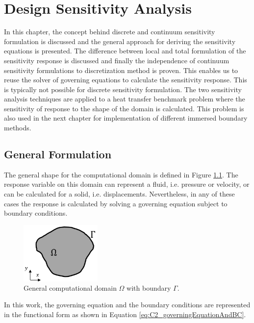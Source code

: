 \chapter{Design Sensitivity Analysis}\label{ch:sensitivityAnalysis}
In this chapter, the concept behind discrete and continuum sensitivity formulation is discussed and the general approach for deriving the sensitivity equations is presented. The difference between local and total formulation of the sensitivity response is discussed and finally the independence of continuum sensitivity formulations to discretization method is proven. This enables us to reuse the solver of governing equations to calculate the sensitivity response. This is typically not possible for discrete sensitivity formulation. The two sensitivity analysis techniques are applied to a heat transfer benchmark problem where the sensitivity of response to the shape of the domain is calculated. This problem is also used in the next chapter for implementation of different immersed boundary methods.

\section{General Formulation}
The general shape for the computational domain is defined in Figure \ref{fig:C2_continuumDomain}. The response variable on this domain can represent a fluid, i.e. pressure or velocity, or can be calculated for a solid, i.e. displacements. Nevertheless, in any of these cases the response is calculated by solving a governing equation subject to boundary conditions. 

\begin{figure}
	\centering
	\includegraphics[width=4.00cm]{Chapter_2/figure/general_domain.png}
	\caption{General computational domain $\Omega$ with boundary $\Gamma$.}
	\label{fig:C2_continuumDomain}
\end{figure}

In this work, the governing equation and the boundary conditions are represented in the functional form as shown in Equation \eqref{eq:C2_governingEquationAndBC}.

